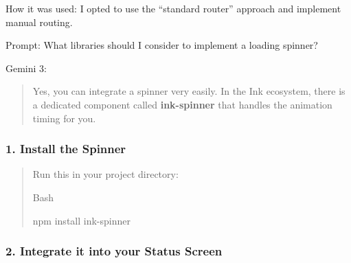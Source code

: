 \documentclass[
]{article}
\begin{document}
How it was used: I opted to use the ``standard router'' approach and
implement manual routing.

Prompt: What libraries should I consider to implement a loading spinner?

Gemini 3:

\begin{quote}
Yes, you can integrate a spinner very easily. In the Ink ecosystem,
there is a dedicated component called \textbf{ink-spinner} that handles
the animation timing for you.
\end{quote}

\hypertarget{install-the-spinner}{%
\subsubsection{\texorpdfstring{\textbf{1. Install the
Spinner}}{1. Install the Spinner}}\label{install-the-spinner}}

\begin{quote}
Run this in your project directory:

Bash

npm install ink-spinner
\end{quote}

\hypertarget{integrate-it-into-your-status-screen}{%
\subsubsection{\texorpdfstring{\textbf{2. Integrate it into your Status
Screen}}{2. Integrate it into your Status Screen}}\label{integrate-it-into-your-status-screen}}
\end{document}
